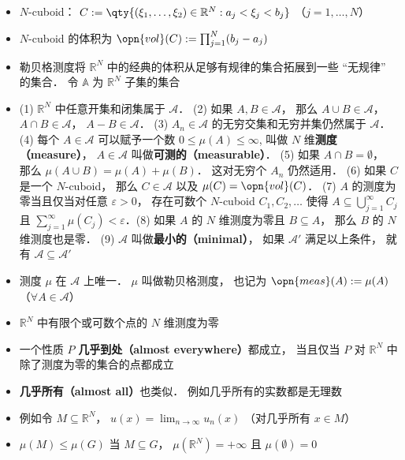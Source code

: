 \begin{itemize}
\item $N$-cuboid： $C := \qty{(\xi_1, \dots, \xi_2) \in \mathbb R^N: a_j < \xi_j < b_j}$ （$j = 1, \dots, N$）

\item $N$-cuboid 的体积为 $\opn{vol}(C) := \prod_{j=1}^N(b_j - a_j)$

\item 勒贝格测度将 $\mathbb R^N$ 中的经典的体积从足够有规律的集合拓展到一些 “无规律” 的集合． 令 $\mathbb A$ 为 $\mathbb R^N$ 子集的集合

\item (1) $\mathbb R^N$ 中任意开集和闭集属于 $\mathcal A$． (2) 如果 $A, B \in \mathcal A$， 那么 $A\cup B \in \mathcal A$， $A\cap B \in \mathcal A$， $A - B \in \mathcal A$． (3) $A_n \in \mathcal A$ 的无穷交集和无穷并集仍然属于 $\mathcal A$． (4) 每个 $A \in\mathcal A$ 可以赋予一个数 $0 \le \mu(A) \le \infty$, 叫做 $N$ 维\textbf{测度（measure）}， $A\in\mathcal A$ 叫做\textbf{可测的（measurable）}． (5) 如果 $A\cap B = \emptyset$， 那么 $\mu(A\cup B) = \mu(A) + \mu(B)$． 这对无穷个 $A_n$ 仍然适用． (6) 如果 $C$ 是一个 $N$-cuboid， 那么 $C\in\mathcal A$ 以及 $\mu(C) = \opn{vol}(C)$． (7) $A$ 的测度为零当且仅当对任意 $\varepsilon>0$， 存在可数个 $N$-cuboid $C_1, C_2, \dots$ 使得 $A \subseteq \bigcup_{j=1}^\infty C_j$ 且 $\sum_{j=1}^\infty \mu(C_j) < \varepsilon$．(8) 如果 $A$ 的 $N$ 维测度为零且 $B\subseteq A$， 那么 $B$ 的 $N$ 维测度也是零． (9) $\mathcal A$ 叫做\textbf{最小的（minimal）}， 如果 $\mathcal A'$ 满足以上条件， 就有 $\mathcal A \subseteq \mathcal A'$

\item 测度 $\mu$ 在 $\mathcal A$ 上唯一． $\mu$ 叫做勒贝格测度， 也记为 $\opn{meas}(A) := \mu(A)$ （$\forall A\in\mathcal A$）

\item $\mathbb R^N$ 中有限个或可数个点的 $N$ 维测度为零

\item 一个性质 $P$ \textbf{几乎到处（almost everywhere）}都成立， 当且仅当 $P$ 对 $\mathbb R^N$ 中除了测度为零的集合的点都成立

\item \textbf{几乎所有（almost all）}也类似． 例如几乎所有的实数都是无理数

\item 例如令 $M\subseteq\mathbb R^N$， $u(x) = \lim_{n\to\infty} u_n(x)$ （对几乎所有 $x\in M$）

\item $\mu(M)\le\mu(G)$ 当 $M\subseteq G$， $\mu(\mathbb R^N) = +\infty$ 且 $\mu(\emptyset) = 0$
\end{itemize}


